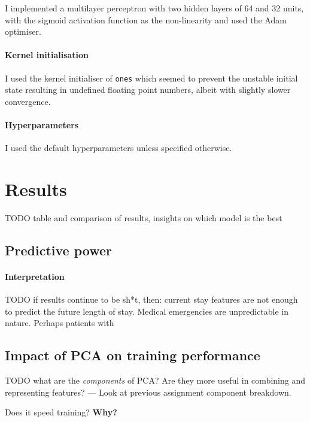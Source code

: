 \documentclass[10pt, twocolumn]{article}
\begin{document}

I implemented a multilayer perceptron with two hidden layers of 64 and 32 units, with the sigmoid activation function as the non-linearity and used the Adam optimiser. 

\paragraph{Kernel initialisation} I used the kernel initialiser of \texttt{ones} which seemed to prevent the unstable initial state resulting in undefined floating point numbers, albeit with slightly slower convergence.


\paragraph{Hyperparameters} I used the default hyperparameters unless specified otherwise.

\section{Results}
TODO table and comparison of results, insights on which model is the best




\subsection{Predictive power}

\paragraph{Interpretation}
TODO if results continue to be sh*t, then: current stay features are not enough to predict the future length of stay. Medical emergencies are unpredictable in nature. Perhaps patients with 

\subsection{Impact of PCA on training performance}
TODO what are the \textit{components} of PCA? Are they more useful in combining and representing features? — Look at previous assignment component breakdown.

Does it speed training? \textbf{Why?}
\end{document}
